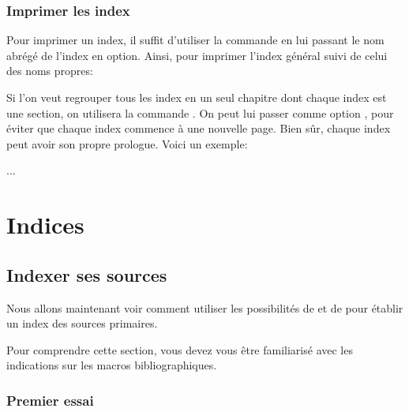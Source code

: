 \subsection{Imprimer les index}

Pour imprimer un index, il suffit d'utiliser la commande  en lui passant le nom abrégé de l'index en option. Ainsi, pour imprimer l'index général suivi de celui des noms propres:

\begin{latexcode}
\printindex
\printindex[npr]
\end{latexcode}


\begin{plusloins}
Si l'on veut regrouper tous les index en un seul chapitre dont chaque index est une section, on utilisera   la commande . On peut lui passer comme option , pour  éviter que chaque index commence à une nouvelle page. Bien sûr, chaque index peut avoir son propre prologue. Voici un exemple: 
\begin{latexcode}
... 
\chapter*{Indices}
\printindex

\printindex[npr] 
\end{latexcode}
\end{plusloins}

\section{Indexer ses sources}

Nous allons maintenant voir comment utiliser les possibilités de  et de  pour établir un index des sources primaires.

Pour comprendre cette section, vous devez vous être familiarisé avec les indications sur les macros bibliographiques.



\subsection{Premier essai}

